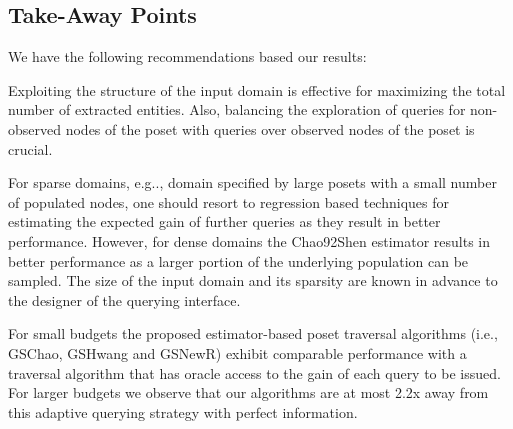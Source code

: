 \subsection{Take-Away Points}
We have the following recommendations based our results:
\squishlist
\item Exploiting the structure of the input domain is effective for maximizing the total number of extracted entities. Also, balancing the exploration of queries for non-observed nodes of the poset with queries over observed nodes of the poset is crucial.
\item For sparse domains, e.g.., domain specified by large posets with a small number of populated nodes, one should resort to regression based techniques for estimating the expected gain of further queries as they result in better performance. However, for dense domains the Chao92Shen estimator results in better performance as a larger portion of the underlying population can be sampled. The size of the input domain and its sparsity are known in advance to the designer of the querying interface. 
\item For small budgets the proposed estimator-based poset traversal algorithms (i.e., GSChao, GSHwang and GSNewR) exhibit comparable performance with a traversal algorithm that has oracle access to the gain of each query to be issued. For larger budgets we observe that our algorithms are at most 2.2x away from this adaptive querying strategy with perfect information.
\squishend